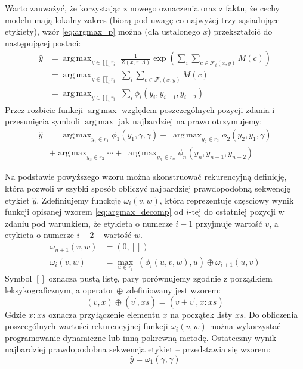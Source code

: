 \documentclass[a4paper,10]{article}
\DeclareMathOperator*{\argmax}{arg\,max}
\begin{document}
Warto zauważyć, że korzystając z nowego oznaczenia oraz z faktu, że cechy
modelu mają lokalny zakres (biorą pod uwagę co najwyżej trzy sąsiadujące
etykiety), wzór \ref{eq:argmax_p} można (dla ustalonego $x$) przekształcić
do następującej postaci:
\begin{align}\label{eq:argmax_phi}
\hat y 
  &= \argmax_{y \in \prod_i r_i} \; 
    \frac{1}{Z(x, r, \Lambda)} \exp
      \left(
        \sum_{i} \sum_{c \in \mathcal F_i(x, y)} M(c)
      \right) \\
  &= \argmax_{y \in \prod_i r_i} \; 
        \sum_{i} \sum_{c \in \mathcal F_i(x, y)} M(c) \nonumber \\
  &= \argmax_{y \in \prod_i r_i} \; 
        \sum_{i} \phi_i(y_{i}, y_{i-1}, y_{i-2}) \nonumber
\end{align}
Przez rozbicie funkcji $\argmax$ względem poszczególnych pozycji zdania
i przesunięcia symboli $\argmax$ jak najbardziej na prawo otrzymujemy:
\begin{align}\label{eq:argmax_decomp}
\hat y
  &= \argmax_{y_1 \in r_1} \phi_1(y_1, \gamma, \gamma) +
  \; \argmax_{y_2 \in r_2} \phi_2(y_2, y_1, \gamma) \\
  &+ \argmax_{y_3 \in r_3} \dotsm +
  \; \argmax_{y_n \in r_n} \phi_n(y_n, y_{n-1}, y_{n-2}) \nonumber
\end{align}

Na podstawie powyższego wzoru można skonstruować rekurencyjną definicję,
która pozwoli w szybki sposób obliczyć najbardziej prawdopodobną sekwencję
etykiet $\hat y$. Zdefiniujemy funckcję $\omega_i(v, w)$, która reprezentuje
częsciowy wynik funkcji opisanej wzorem \ref{eq:argmax_decomp} od $i$-tej
do ostatniej pozycji w zdaniu pod warunkiem, że etykieta o numerze $i - 1$
przyjmuje wartość $v$, a etykieta o numerze $i - 2$ -- wartość $w$.
\begin{align}\label{eq:argmax_rec}
\omega_{n+1}(v, w) &= (0, []) \\
\omega_i(v, w) &= \max_{u \in r_i} \;
  (\phi_i(u, v, w), u) \oplus \omega_{i+1}(u, v)
\end{align}
Symbol $[]$ oznacza pustą listę, pary porównujemy zgodnie z porządkiem
leksykograficznym, a operator $\oplus$ zdefiniowany jest wzorem:
\begin{equation}
(v, x) \oplus (v^\prime, xs) = (v + v^\prime, x : xs)
\end{equation}
Gdzie $x : xs$ oznacza przyłączenie elementu $x$ na początek listy $xs$.
Do obliczenia poszcególnych wartości rekurencyjnej funkcji $\omega_i(v, w)$
można wykorzystać programowanie dynamiczne lub inną pokrewną metodę.
Ostateczny wynik -- najbardziej prawdopodobna sekwencja etykiet
-- przedstawia się wzorem:
\begin{equation}
\hat y = \omega_1(\gamma, \gamma)
\end{equation}
\end{document}

